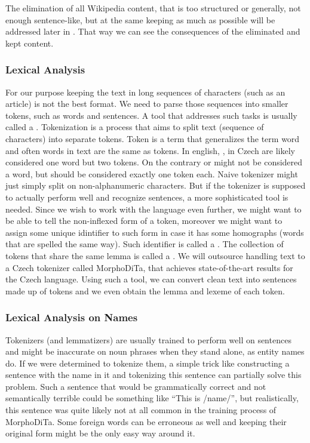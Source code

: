 The elimination of all Wikipedia content, that is too structured or generally, not enough sentence-like, but at the same keeping as much as possible will be addressed later in . That way we can see the consequences of the eliminated and kept content.


\subsubsection{Lexical Analysis}
For our purpose keeping the text in long sequences of characters (such as an article) is not the best format. We need to parse those sequences into smaller tokens, such as words and sentences. A tool that addresses such tasks is usually called a .
Tokenization is a process that aims to split text (sequence of characters) into separate tokens. Token is a term that generalizes the term word and often words in text are the same as tokens. In english, , in Czech  are likely considered one word but two tokens. On the contrary  or  might not be considered a word, but should be considered exactly one token each. Naive tokenizer might just simply split on non-alphanumeric characters. But if the tokenizer is supposed to actually perform well and recognize sentences, a more sophisticated tool is needed. 
Since we wish to work with the language even further, we might want to be able to tell the non-inflexed form of a token, moreover we might want to assign some unique idintifier to such form in case it has some homographs (words that are spelled the same way). Such identifier is called a . The collection of tokens that share the same lemma is called a . 
We will outsource handling text to a Czech tokenizer called MorphoDiTa, that achieves state-of-the-art results for the Czech language. Using such a tool, we can convert clean text into sentences made up of tokens and we even obtain the lemma and lexeme of each token.

\subsubsection{Lexical Analysis on Names}
Tokenizers (and lemmatizers) are usually trained to perform well on sentences and might be inaccurate on noun phrases when they stand alone, as entity names do. If we were determined to tokenize them, a simple trick like constructing a sentence with the name in it and tokenizing this sentence can partially solve this problem. Such a sentence that would be grammatically correct and not semantically terrible could be something like “This is /name/”, but realistically, this sentence was quite likely not at all common in the training process of MorphoDiTa. Some foreign words can be erroneous as well and keeping their original form might be the only easy way around it.

